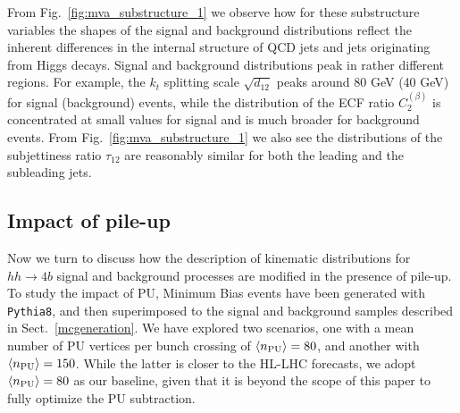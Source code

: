 From Fig.~\ref{fig:mva_substructure_1}
we observe how for these substructure variables the shapes of the signal
and background distributions reflect
the inherent differences in the internal structure of
QCD jets and jets originating from Higgs decays.
%
Signal and background distributions peak
in rather
different regions. For example, the $k_t$ splitting scale $\sqrt{d_{12}}$
peaks around 80 GeV (40 GeV) for signal (background) events, while
the distribution of the
ECF ratio $C_2^{(\beta)}$ is concentrated at small values
for signal and is much broader for background events.
%
From Fig.~\ref{fig:mva_substructure_1} we also see
the distributions of the subjettiness ratio $\tau_{12}$ are
reasonably similar
for both the leading and the subleading jets.
%

\subsection{Impact of pile-up}
\label{sec:pileup}

Now we turn to discuss how the description of kinematic
distributions for $hh\to 4b$ signal
and background processes are
modified in the presence of pile-up.
%
To study the impact of PU,
Minimum Bias events have been generated
with {\tt Pythia8}, and then
superimposed to the signal
and background samples described in Sect.~\ref{mcgeneration}.
%
We have explored two scenarios,
one with a mean number of
PU vertices per bunch crossing of $\left\langle n_{\rm PU}\right\rangle=80$,
and another
with $\left\langle n_{\rm PU}\right\rangle=150$.
%
While the latter is closer to the HL-LHC forecasts,
we adopt $\left\langle n_{\rm PU}\right\rangle=80$ as our baseline,
given that it
is beyond the scope of this paper to fully optimize
the PU subtraction.

